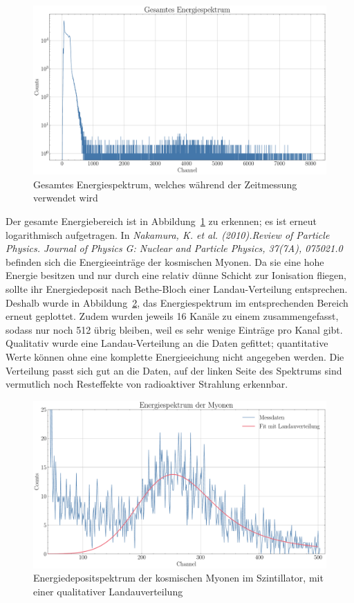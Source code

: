 \documentclass[12pt,a4paper,ngerman]{report}
\begin{document}
	\begin{figure}[ht]
		\centering
		\includegraphics[width=\textwidth]{Bilder/gesamterEnBereich.pdf}		
		\caption[Energiespektrum]{Gesamtes Energiespektrum, welches während der Zeitmessung verwendet wird}
		\label{img:gesamterEnBereich}
	\end{figure}
	Der gesamte Energiebereich ist in Abbildung~\ref{img:gesamterEnBereich} zu erkennen; es ist erneut logarithmisch aufgetragen. In \emph{Nakamura, K. et al. (2010).\@ Review of Particle Physics. Journal of Physics G: Nuclear and Particle Physics, 37(7A), 075021.0} befinden sich die Energieeinträge der kosmischen Myonen. Da sie eine hohe Energie besitzen und nur durch eine relativ dünne Schicht zur Ionisation fliegen, sollte ihr Energiedeposit nach Bethe-Bloch einer Landau-Verteilung entsprechen.\\
	Deshalb wurde in Abbildung~\ref{img:MyonenLandau}, das Energiespektrum im entsprechenden Bereich erneut geplottet. Zudem wurden jeweils 16 Kanäle zu einem zusammengefasst, sodass nur noch 512 übrig bleiben, weil es sehr wenige Einträge pro Kanal gibt. Qualitativ wurde eine Landau-Verteilung an die Daten gefittet; quantitative Werte können ohne eine komplette Energieeichung nicht angegeben werden. Die Verteilung passt sich gut an die Daten, auf der linken Seite des Spektrums sind vermutlich noch Resteffekte von radioaktiver Strahlung erkennbar. 
	\begin{figure}[ht]
		\centering
		\includegraphics[width=\textwidth]{Bilder/MyonenLandau.pdf}		
		\caption[Energiedepositspektrum]{Energiedepositspektrum der kosmischen Myonen im Szintillator, mit einer qualitativer Landauverteilung}
		\label{img:MyonenLandau}
	\end{figure}
\end{document}
